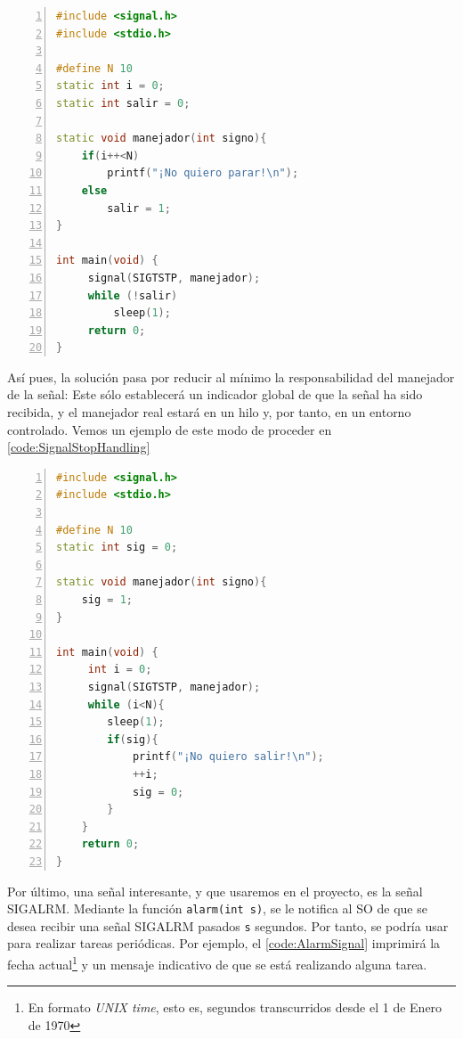 \begin{lstlisting}[language=C++,caption={Manejo ingenuo de la señal \gls{SIGTSTP}}, 
breaklines=true, label=code:dumbSignalStopHandling,numbers=left,float=htbp]
#include <signal.h>
#include <stdio.h>

#define N 10
static int i = 0;
static int salir = 0;

static void manejador(int signo){
    if(i++<N)
        printf("¡No quiero parar!\n");
    else
        salir = 1;
}

int main(void) {
     signal(SIGTSTP, manejador);
     while (!salir)
         sleep(1);
     return 0;
}
\end{lstlisting}

Así pues, la solución pasa por reducir al mínimo la responsabilidad del manejador de la señal: Este sólo establecerá un 
indicador global de que la señal ha sido recibida, y el manejador real estará en un hilo y, por tanto, en un entorno 
controlado. Vemos un ejemplo de este modo de proceder en \lstlistingname{} \ref{code:SignalStopHandling}

\begin{lstlisting}[language=C++,caption={Manejo de la señal \gls{SIGTSTP}}, 
breaklines=true, label=code:SignalStopHandling,numbers=left,float=htbp]
#include <signal.h>
#include <stdio.h>

#define N 10
static int sig = 0;

static void manejador(int signo){
    sig = 1;
}

int main(void) {
     int i = 0;
     signal(SIGTSTP, manejador);
     while (i<N){
        sleep(1);
        if(sig){
            printf("¡No quiero salir!\n");
            ++i;
            sig = 0;
        }
    }
    return 0;
}
\end{lstlisting}

Por último, una señal interesante, y que usaremos en el proyecto, es la señal \gls{SIGALRM}. Mediante la función \texttt{alarm(int s)}, se le notifica al \gls{SO} 
de que se desea recibir una señal \gls{SIGALRM} pasados \texttt{s} segundos. Por tanto, se podría usar para realizar 
tareas periódicas. Por ejemplo, el \lstlistingname{} \ref{code:AlarmSignal} imprimirá la fecha actual\footnote{En 
formato \emph{UNIX time}, esto es, segundos transcurridos desde el 1 de Enero de 1970} y un mensaje 
indicativo de que se está realizando alguna tarea.

